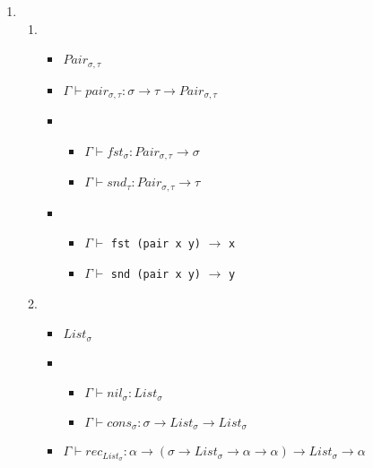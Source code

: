 \documentclass[12pt,a4paper]{article}
\begin{document}
\begin{enumerate}
{\begin{enumerate}
{\begin{lstlisting}[language=Haskell]
fac :: Nat -> Nat
fac = rec 1 multSucc
			\end{lstlisting}
		}
		\item {
%
		}
	\end{enumerate}
}
\item {
	\begin{enumerate}
	\item {
		\begin{itemize}
			\item $Pair_{\sigma,\tau}$
			\item $\Gamma \vdash pair_{\sigma,\tau} \colon \sigma \rightarrow \tau \rightarrow Pair_{\sigma,\tau}$
			\item {
				\begin{itemize}
					\item $\Gamma \vdash fst_{\sigma} \colon Pair_{\sigma,\tau} \rightarrow \sigma$
					\item $\Gamma \vdash snd_{\tau} \colon Pair_{\sigma,\tau} \rightarrow \tau$
				\end{itemize}
			}
			\item {
				\begin{itemize}
					\item $\Gamma \vdash$ \texttt{fst (pair x y)} $\rightarrow$ \texttt{x}
					\item $\Gamma \vdash$ \texttt{snd (pair x y)} $\rightarrow$ \texttt{y}
				\end{itemize}
			}
		\end{itemize}
	}
	\item {
		\begin{itemize}
			\item $List_{\sigma}$
			\item {
				\begin{itemize}
					\item $\Gamma \vdash nil_{\sigma} \colon List_{\sigma}$
					\item $\Gamma \vdash cons_{\sigma} \colon \sigma \rightarrow List_{\sigma} \rightarrow List_{\sigma}$
				\end{itemize}
			}
			\item $\Gamma \vdash rec_{List_{\sigma}} \colon \alpha \rightarrow (\sigma \rightarrow List_{\sigma} \rightarrow \alpha \rightarrow \alpha) \rightarrow List_{\sigma} \rightarrow \alpha$

\end{itemize}}
\end{enumerate}}
\end{enumerate}
\end{document}
